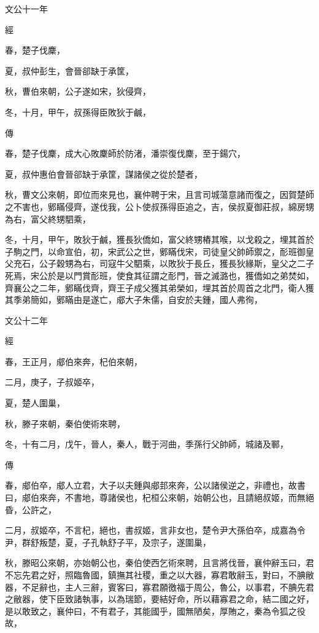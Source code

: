 \documentclass{ctexart}
\begin{document}
文公十一年


經



春，楚子伐麇，

夏，叔仲彭生，會晉郤缺于承筐，

秋，曹伯來朝，公子遂如宋，狄侵齊，

冬，十月，甲午，叔孫得臣敗狄于鹹，

傳



春，楚子伐麇，成大心敗麇師於防渚，潘崇復伐麇，至于鍚穴，

夏，叔仲惠伯會晉郤缺于承筐，謀諸侯之從於楚者，

秋，曹文公來朝，即位而來見也，襄仲聘于宋，且言司城蕩意諸而復之，因賀楚師之不害也，鄋瞞侵齊，遂伐我，公卜使叔孫得臣追之，吉，侯叔夏御莊叔，綿房甥為右，富父終甥駟乘，

冬，十月，甲午，敗狄于鹹，獲長狄僑如，富父終甥樁其喉，以戈殺之，埋其首於子駒之門，以命宣伯，初，宋武公之世，鄋瞞伐宋，司徒皇父帥師禦之，耏班御皇父充石，公子穀甥為右，司寇牛父駟乘，以敗狄于長丘，獲長狄緣斯，皇父之二子死焉，宋公於是以門賞耏班，使食其征謂之耏門，晉之滅潞也，獲僑如之弟焚如，齊襄公之二年，鄋瞞伐齊，齊王子成父獲其弟榮如，埋其首於周首之北門，衛人獲其季弟簡如，鄋瞞由是遂亡，郕大子朱儒，自安於夫鍾，國人弗徇，





文公十二年


經



春，王正月，郕伯來奔，杞伯來朝，

二月，庚子，子叔姬卒，

夏，楚人圍巢，

秋，滕子來朝，秦伯使術來聘，

冬，十有二月，戊午，晉人，秦人，戰于河曲，季孫行父帥師，城諸及鄆，

傳



春，郕伯卒，郕人立君，大子以夫鍾與郕邽來奔，公以諸侯逆之，非禮也，故書曰，郕伯來奔，不書地，尊諸侯也，杞桓公來朝，始朝公也，且請絕叔姬，而無絕昏，公許之，

二月，叔姬卒，不言杞，絕也，書叔姬，言非女也，楚令尹大孫伯卒，成嘉為令尹，群舒叛楚，夏，子孔執舒子平，及宗子，遂圍巢，

秋，滕昭公來朝，亦始朝公也，秦伯使西乞術來聘，且言將伐晉，襄仲辭玉曰，君不忘先君之好，照臨魯國，鎮撫其社稷，重之以大器，寡君敢辭玉，對曰，不腆敝器，不足辭也，主人三辭，賓客曰，寡君願徼福于周公，魯公，以事君，不腆先君之敝器，使下臣致諸執事，以為瑞節，要結好命，所以藉寡君之命，結二國之好，是以敢致之，襄仲曰，不有君子，其能國乎，國無陋矣，厚賄之，秦為令狐之役故，
\end{document}
